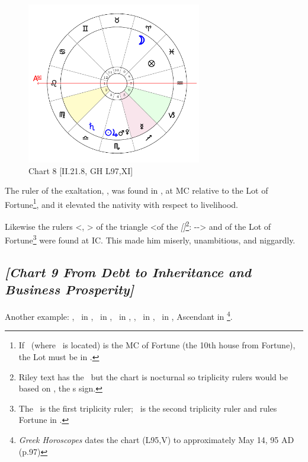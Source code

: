 \clearpage
\begin{figure}
\centering
\vspace{-20pt}
\includegraphics[width=0.68\textwidth]{charts/2_21_8}
\caption{Chart 8 [II.21.8, GH L97,XI]}
\label{fig:chart08}
\end{figure}

The ruler of the exaltation, \Mercury, was found in \Sagittarius, at MC relative to the Lot of Fortune\footnote{If \Sagittarius\, (where \Mercury\, is located) is the MC of Fortune (the 10th house from Fortune), the Lot must be in \Pisces.}, and it elevated the nativity with respect to livelihood. 

Likewise the rulers <\Sun, \Jupiter> of the triangle <of the \textsl{[\Moon]}\footnote{Riley text has the \Sun\, but the chart is nocturnal so triplicity rulers would be based on \Aries, the \Moon
s sign.}: \Aries-\Leo-\Sagittarius> and of the Lot of Fortune\footnote{The \Sun\, is the first triplicity ruler; \Jupiter\, is the second triplicity ruler and rules Fortune in \Pisces.} were found at IC. This made him miserly, unambitious, and niggardly.

\newpage
\subsection*{\textit{[Chart 9 From Debt to Inheritance and Business Prosperity]}}
\addcontentsline{toc}{subsection}{\textit{[Chart 9 [GH L95] From Debt to Inheritance and Business Prosperity}}

Another example: \Sun, \Mercury\, in \Taurus, \Moon\, in \Aquarius, \Saturn\, in \Leo, \Mars, \Venus\, in \Cancer, \Jupiter\, in \Virgo, Ascendant in \Sagittarius
\footnote{\textit{Greek Horoscopes} dates the chart (L95,V) to approximately May 14, 95 AD (p.97)}.

